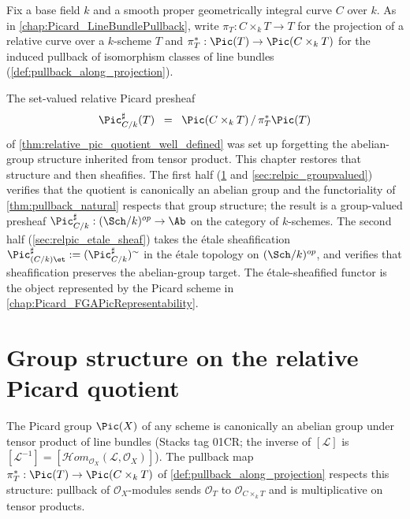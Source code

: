 Fix a base field \(k\) and a smooth proper geometrically integral curve \(C\) over
\(k\). As in \cref{chap:Picard_LineBundlePullback}, write
\(\pi_T : C \times_k T \to T\) for the projection of a relative curve over a
\(k\)-scheme \(T\) and
\(\pi_T^* : \Pic(T) \to \Pic(C \times_k T)\) for the induced pullback of
isomorphism classes of line bundles (\cref{def:pullback_along_projection}).

The set-valued relative Picard presheaf
\[
  \Pic^\sharp_{C/k}(T) \;\;=\;\; \Pic(C \times_k T) \, / \, \pi_T^*\Pic(T)
\]
of \cref{thm:relative_pic_quotient_well_defined} was set up forgetting the
abelian-group structure inherited from tensor product. This chapter restores
that structure and then sheafifies. The first half (\cref{sec:relpic_group}
and \cref{sec:relpic_groupvalued}) verifies that the quotient is canonically
an abelian group and the functoriality of \cref{thm:pullback_natural} respects
that group structure; the result is a group-valued presheaf
\(\Pic^\sharp_{C/k} : (\Sch/k)^{op} \to \Ab\) on the category of \(k\)-schemes. The
second half (\cref{sec:relpic_etale_sheaf}) takes the \'etale sheafification
\(\Pic^\sharp_{(C/k)\et} := (\Pic^\sharp_{C/k})^\sim\) in the \'etale topology on
\((\Sch/k)^{op}\), and verifies that sheafification preserves the abelian-group
target. The \'etale-sheafified functor is the object represented by the Picard
scheme in \cref{chap:Picard_FGAPicRepresentability}.

\section{Group structure on the relative Picard quotient}
\label{sec:relpic_group}

The Picard group \(\Pic(X)\) of any scheme is canonically an abelian group under
tensor product of line bundles (Stacks tag 01CR; the inverse of \([\mathcal{L}]\)
is $[\mathcal{L}^{-1}] = [\mathcal{H}om_{\mathcal{O}_X}(\mathcal{L},
\mathcal{O}_X)]$). The pullback map
\(\pi_T^* : \Pic(T) \to \Pic(C \times_k T)\) of
\cref{def:pullback_along_projection} respects this structure: pullback of
\(\mathcal{O}_X\)-modules sends \(\mathcal{O}_T\) to \(\mathcal{O}_{C \times_k T}\)
and is multiplicative on tensor products.

